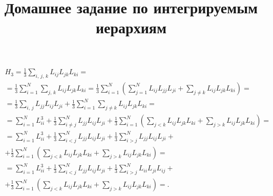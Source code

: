 \documentclass[a4paper]{article}
\title{Домашнее задание по интегрируемым иерархиям}
\begin{document}
	\maketitle
\begin{hiProb}[Упражнение 1.2]
\end{hiProb}
\begin{sol}
\begin{multline*}
	H_3=\frac{1}{3}\sum_{i,\,j,\,k}^{} L_{ij}L_{jk} L_{ki}=\\=
	\frac{1}{3}\sum_{i=1}^{N} \sum_{j,\,k}^{} L_{ij}L_{jk}L_{ki}=\frac{1}{3}\sum_{i=1}^{N} \left( \sum_{j=1}^{N} L_{ij}L_{jj}L_{ji}+ \sum_{j\neq k}^{} L_{ij}L_{jk}L_{ki} \right) =\\=
	\frac{1}{3}\sum_{i,\,j}^{} L_{jj}L_{ij}L_{ji}+\frac{1}{3}
	\sum_{i=1}^{N} \sum_{j \neq k}^{} L_{ij}L_{jk}L_{ki}=\\=
	\sum_{i=1}^{N} L_{ii}^3+ \frac{1}{3}\sum_{i\neq j}^{N} L_{jj}L_{ij}L_{ji}+\frac{1}{3}\sum_{i=1}^{N} \left( 
	\sum_{j<k}^{} L_{ij}L_{jk}L_{ki}+\sum_{j>k}^{} L_{ij}L_{jk}L_{ki}\right) =\\=
	\sum_{i=1}^{N} L_{ii}^3+ \frac{1}{3}\sum_{i< j}^{N} L_{jj}L_{ij}L_{ji}+\frac{1}{3}\sum_{i> j}^{N} L_{jj}L_{ij}L_{ji}+\\+\frac{1}{3}\sum_{i=1}^{N} \left( 
	\sum_{j<k}^{} L_{ij}L_{jk}L_{ki}+\sum_{j>k}^{} L_{ij}L_{jk}L_{ki}\right) =\\=
	\sum_{i=1}^{N} L_{ii}^3+ \frac{1}{3}\sum_{i< j}^{N} L_{jj}L_{ij}L_{ji}+\frac{1}{3}\sum_{i> j}^{N} L_{ii}L_{ji}L_{ij}+\\+\frac{1}{3}\sum_{i=1}^{N} \left( 
	\sum_{j<k}^{} L_{ij}L_{jk}L_{ki}+\sum_{j>k}^{} L_{ij}L_{jk}L_{ki}\right) =
.\end{multline*} 
\end{sol}
\end{document}
